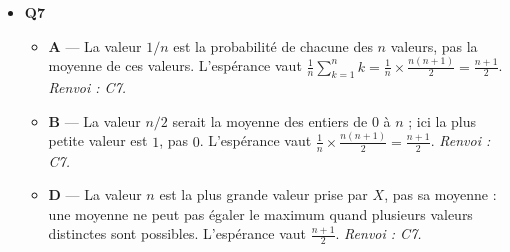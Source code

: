\begin{itemize}
\begin{itemize}
    \item \textbf{A} — La valeur $1/2$ est la probabilité de succès $p$, pas une moyenne du nombre de succès. Le calcul direct donne $E(X)=0\times\tfrac18+1\times\tfrac38+2\times\tfrac38+3\times\tfrac18=\tfrac{12}8=\tfrac32$, soit $np$. \emph{Renvoi : C6.}
    \item \textbf{C} — La valeur $3$ est le nombre de répétitions $n$ : ce serait l'espérance si chaque répétition était un succès certain. Le calcul direct donne $E(X)=\tfrac{12}8=\tfrac32$, soit $np$. \emph{Renvoi : C6.}
    \item \textbf{D} — La valeur $3/4$ est la variance $np(1-p)$, qui mesure la dispersion et non la moyenne. Le calcul direct donne $E(X)=\tfrac{12}8=\tfrac32$, soit $np$. \emph{Renvoi : C6.}
  \end{itemize}
  \item \textbf{Q7}
  \begin{itemize}
    \item \textbf{A} — La valeur $1/n$ est la probabilité de chacune des $n$ valeurs, pas la moyenne de ces valeurs. L'espérance vaut $\tfrac1n\sum_{k=1}^{n}k=\tfrac1n\times\tfrac{n(n+1)}2=\tfrac{n+1}2$. \emph{Renvoi : C7.}
    \item \textbf{B} — La valeur $n/2$ serait la moyenne des entiers de $0$ à $n$ ; ici la plus petite valeur est $1$, pas $0$. L'espérance vaut $\tfrac1n\times\tfrac{n(n+1)}2=\tfrac{n+1}2$. \emph{Renvoi : C7.}
    \item \textbf{D} — La valeur $n$ est la plus grande valeur prise par $X$, pas sa moyenne : une moyenne ne peut pas égaler le maximum quand plusieurs valeurs distinctes sont possibles. L'espérance vaut $\tfrac{n+1}2$. \emph{Renvoi : C7.}
  \end{itemize}
\end{itemize}
\fi
